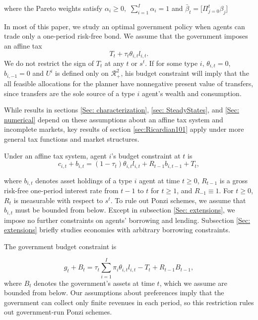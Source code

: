 \documentclass[thmsb,11pt]{article}
\begin{document}
where the Pareto weights satisfy $\alpha _{i}\geq 0,$ $\sum_{i=1}^{I}\alpha _{i}=1$ and $\bar{\beta}_t=\bigl[\Pi_{j=0}^t \beta_j\bigr]$

In most of this paper, we study an optimal  government policy when agents can   trade
only a one-period risk-free bond.  We assume that the government  imposes an
affine tax
\begin{equation*}
T_t + \tau_t \theta_{i,t}l_{i,t}. \end{equation*}
We do not restrict the sign of $T_{t}$ at any $t$ or $s^t$. %
If for some type $i$, $\theta _{i,t}=0$, $b_{i, -1} = 0$ and $U^i$ is defined only on $\mathcal{R}^2_{+}$, his budget constraint will imply that the all feasible allocations for the planner have nonnegative present value of
transfers, since transfers are the sole source of a type $i$ agent's wealth and consumption.

While results in sections \ref{Sec: characterization}, \ref{sec: SteadyStates}, and  \ref{Sec: numerical}  depend on these  assumptions about an affine tax system and incomplete markets,
  key results of  section  \ref{sec:Ricardian101} apply under  more general tax functions and
market structures.

Under an affine tax system, agent $i$'s budget constraint at $t$ is%
\begin{equation}
c_{i,t}+b_{i,t}=\left( 1-\tau _{t}\right) \theta
_{i,t}l_{i,t}+R_{t-1}b_{i,t-1}+T_{t},  \label{agent bc affine}
\end{equation}

\noindent where $b_{i,t}$ denotes asset holdings of a type $i$ agent  at time $t\geq 0$, $%
R_{t-1}$ is a gross risk-free one-period interest rate from  $t-1$ to
 $t$ for $t\geq 1$, and $R_{-1}\equiv 1$. For $t\geq 0$, $R_{t}$ is
measurable with respect to $s^t$. To rule out Ponzi schemes,
we assume that $b_{i,t}$ must be bounded from below. Except in subsection \ref{Sec: extensions}, we
impose no further constraints on agents'  borrowing  and lending. Subsection \ref{Sec: extensions} briefly studies economies with
arbitrary borrowing constraints.

The government budget constraint is%

\begin{equation}
g_{t}+B_{t}=\tau _{t}\sum_{i=1}^{I}\pi _{i}\theta
_{i,t}l_{i,t}-T_{t}+R_{t-1}B_{t-1},  \label{govmt bc affine}
\end{equation}%
where $B_{t}$ denotes the government's assets at time $t$, which we assume
are bounded from below. Our assumptions about preferences
imply that the government can collect only finite revenues in each period, so
this restriction rules out government-run Ponzi schemes.
\end{document}
